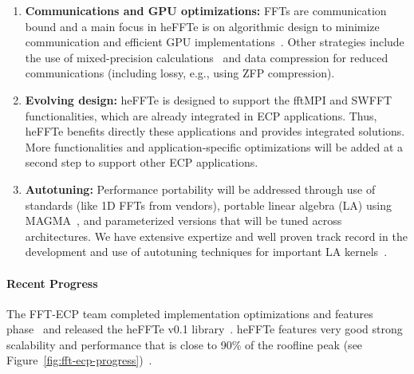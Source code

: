 \begin{enumerate}
\item
\textbf{Communications and GPU optimizations:}
FFTs are communication bound and a main focus in heFFTe is on algorithmic
design to minimize communication and efficient GPU implementations~\cite{eurompi19}.
Other strategies include the use of mixed-precision calculations~\cite{Haidar2018,tcfft18}
and data compression for reduced communications (including lossy, e.g., using ZFP compression).
\item
\textbf{Evolving design:}
heFFTe is designed to support the fftMPI and SWFFT functionalities,
which are already integrated in ECP applications. Thus, heFFTe benefits
directly these applications and provides integrated solutions. 
More functionalities and application-specific optimizations will be added 
at a second step to support other ECP applications. 
\item
\textbf{Autotuning:}
Performance portability will be addressed through use of standards (like 1D FFTs 
from vendors), portable linear algebra (LA) using MAGMA~\cite{Tomov_2010_pcsa}, 
and parameterized versions that will be tuned across architectures. We have extensive 
expertize and well proven track record in the development and use of autotuning techniques 
for important LA kernels~\cite{Nath2010,Kurzak2012gemmfermi}. 
\end{enumerate}

\paragraph{Recent Progress}
The FFT-ECP team completed implementation optimizations and features phase~\cite{thasd19}
and released the heFFTe v0.1 library~\cite{sc19}. heFFTe features very good strong 
scalability and performance that is close to 90\% of the roofline peak 
(see Figure~\ref{fig:fft-ecp-progress})~\cite{sc19,eurompi19}.



